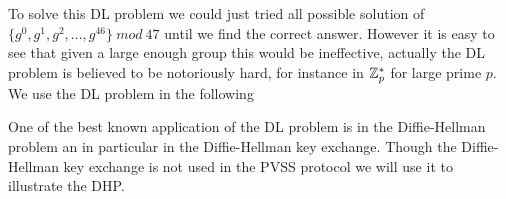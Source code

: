 \noindent
To solve this DL problem we could just tried all possible solution of \\
$ \{g^0, g^1, g^2,...,g^{46}\} \ mod \ 47$ until we find the correct answer. However it is easy to see that given a large enough group this would be ineffective, actually the DL problem is believed to be notoriously hard, for instance in $\mathbb{Z}_p^*$ for large prime $p$. \\

\noindent
We use the DL problem in the following

\iffalse
    \begin{defi}[Computational Diffie-Hellman (CDH) problem]
    \begin{math}g\in\Z_p, \ g\neq1 \end{math}\\
    Given \begin{math}(g,g^a,g^b)\end{math} find(compute)  \begin{math}(g^{a*b})\end{math} is hard problem.\\
    Definition: Need a reference?? \\
    \textcolor{red}{Kasper}
    \end{defi}
\fi

One of the best known application of the DL problem is in the Diffie-Hellman problem an in particular in the Diffie-Hellman key exchange. Though the Diffie-Hellman key exchange is not used in the PVSS protocol we will use it to illustrate the DHP.


